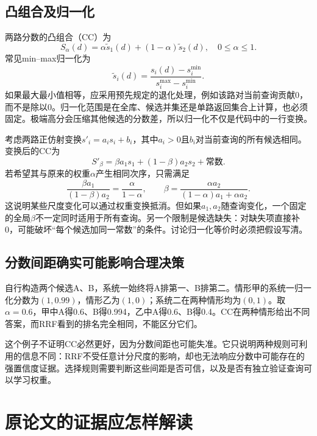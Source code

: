 \documentclass[sigconf,nonacm]{acmart}
\begin{document}
\subsection{凸组合及归一化}
两路分数的凸组合（CC）为
\begin{equation}
 S_{\alpha}(d)=\alpha\widetilde s_1(d)+(1-\alpha)\widetilde s_2(d),
 \quad 0\leq\alpha\leq1.
\end{equation}
常见min--max归一化为
\begin{equation}
 \widetilde s_i(d)=\frac{s_i(d)-s_i^{\min}}
 {s_i^{\max}-s_i^{\min}}.
\end{equation}
如果最大最小值相等，应采用预先规定的退化处理，例如该路对当前查询贡献0，而不是除以0。归一化范围是在全库、候选并集还是单路返回集合上计算，也必须固定。极端高分会压缩其他候选的分数差，所以归一化不仅是代码中的一行变换。

考虑两路正仿射变换$s'_i=a_i s_i+b_i$，其中$a_i>0$且$b_i$对当前查询的所有候选相同。变换后的CC为
\begin{equation}
 S'_{\beta}=\beta a_1s_1+(1-\beta)a_2s_2+\text{常数}.
\end{equation}
若希望其与原来的权重$\alpha$产生相同次序，只需满足
\begin{equation}
 \frac{\beta a_1}{(1-\beta)a_2}=\frac{\alpha}{1-\alpha},\qquad
 \beta=\frac{\alpha a_2}{(1-\alpha)a_1+\alpha a_2}.
\end{equation}
这说明某些尺度变化可以通过权重变换抵消。但如果$a_1,a_2$随查询变化，一个固定的全局$\beta$不一定同时适用于所有查询。另一个限制是候选缺失：对缺失项直接补0，可能破坏“每个候选加同一常数”的条件。讨论归一化等价时必须把假设写清。

\subsection{分数间距确实可能影响合理决策}
自行构造两个候选A、B，系统一始终将A排第一、B排第二。情形甲的系统一归一化分数为$(1,0.99)$，情形乙为$(1,0)$；系统二在两种情形均为$(0,1)$。取$\alpha=0.6$，甲中A得0.6、B得0.994，乙中A得0.6、B得0.4。CC在两种情形给出不同答案，而RRF看到的排名完全相同，不能区分它们。

这个例子不证明CC必然更好，因为分数间距也可能失准。它只说明两种规则可利用的信息不同：RRF不受任意计分尺度的影响，却也无法响应分数中可能存在的强置信度证据。选择规则需要判断这些间距是否可信，以及是否有独立验证查询可以学习权重。

\section{原论文的证据应怎样解读}
\end{document}
